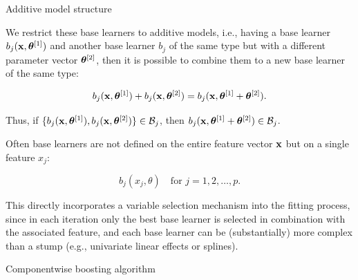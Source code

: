 \documentclass[11pt,compress,t,notes=noshow, xcolor=table]{beamer}
\begin{document}
\begin{vbframe}{Additive model structure}
\begin{footnotesize}
We restrict these base learners to additive models, i.e., having a base learner $ b_j(\mathbf{x}, \bm{\theta}^{[1]})$ and another base learner $b_j$ of the same type but with a different parameter vector $\bm{\theta}^{[2]}$, then it is possible to combine them to a new base learner of the same type:

$$
 b_j(\mathbf{x}, \bm{\theta}^{[1]}) + b_j(\mathbf{x}, \bm{\theta}^{[2]}) =
 b_j(\mathbf{x}, \bm{\theta}^{[1]} + \bm{\theta}^{[2]}).
$$
\vspace*{0.1cm}

Thus, if $\{ b_j(\mathbf{x}, \bm{\theta}^{[1]}), b_j(\mathbf{x}, \bm{\theta}^{[2]}) \} \in \mathcal{B}_j$, then $b_j(\mathbf{x}, \bm{\theta}^{[1]} + \bm{\theta}^{[2]}) \in \mathcal{B}_j$.
\lz

Often base learners are not defined on the entire feature vector $\mathbf{x}$ but on
a single feature $x_j$:

$$
  b_j(x_j, \theta) \quad \text{for } j = 1, 2, \dots, p.
$$

This directly incorporates a variable selection mechanism into the fitting
process, since in each iteration only the best base learner is selected in
combination with the associated feature, and each base learner can be
(substantially) more complex than a stump (e.g., univariate linear effects or
splines).
\end{footnotesize}
\end{vbframe}


\begin{vbframe}{Componentwise boosting algorithm}



\end{vbframe}

\end{document}

